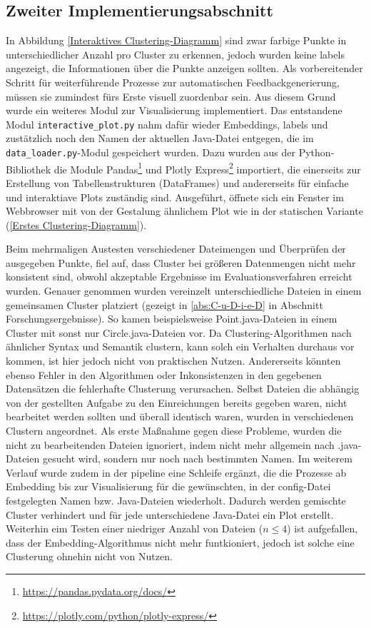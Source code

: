 \subsection{Zweiter Implementierungsabschnitt}
In Abbildung \ref{Interaktives Clustering-Diagramm} sind zwar farbige Punkte in unterschiedlicher Anzahl pro Cluster zu erkennen, jedoch wurden keine labels angezeigt, die Informationen über die Punkte anzeigen sollten. Als vorbereitender Schritt für weiterführende Prozesse zur automatischen Feedbackgenerierung, müssen sie zumindest fürs Erste visuell zuordenbar sein. Aus diesem Grund wurde ein weiteres Modul zur Visualisierung implementiert. Das entstandene Modul \texttt{interactive\_plot.py} nahm dafür wieder Embeddings, labels und zustätzlich noch den Namen der aktuellen Java-Datei entgegen, die im \texttt{data\_loader.py}-Modul gespeichert wurden. Dazu wurden aus der Python-Bibliothek die Module Pandas\footnote{\url{https://pandas.pydata.org/docs/}} und Plotly Express\footnote{\url{https://plotly.com/python/plotly-express/}} importiert, die einerseits zur Erstellung von Tabellenstrukturen (DataFrames) und andererseits für einfache und interaktiave Plots zuständig sind. Ausgeführt, öffnete sich ein Fenster im Webbrowser mit von der Gestalung ähnlichem Plot wie in der statischen Variante (\ref{Erstes Clustering-Diagramm}).

Beim mehrmaligen Austesten verschiedener Dateimengen und Überprüfen der ausgegeben Punkte, fiel auf, dass Cluster bei größeren Datenmengen nicht mehr konsistent sind, obwohl akzeptable Ergebnisse im Evaluationsverfahren erreicht wurden. Genauer genommen wurden vereinzelt unterschiedliche Dateien in einem gemeinsamen Cluster platziert (gezeigt in \ref{abs:C-u-D-i-e-D} in Abschnitt Forschungsergebnisse). So kamen beispielsweise Point.java-Dateien in einem Cluster mit sonst nur Circle.java-Dateien vor. Da Clustering-Algorithmen nach ähnlicher Syntax und Semantik clustern, kann solch ein Verhalten durchaus vor kommen, ist hier jedoch nicht von praktischen Nutzen. Andererseits könnten ebenso Fehler in den Algorithmen oder Inkonsistenzen in den gegebenen Datensätzen die fehlerhafte Clusterung verursachen. Selbst Dateien die abhängig von der gestellten Aufgabe zu den Einreichungen bereits gegeben waren, nicht bearbeitet werden sollten und überall identisch waren, wurden in verschiedenen Clustern angeordnet. Als erste Maßnahme gegen diese Probleme, wurden die nicht zu bearbeitenden Dateien ignoriert, indem nicht mehr allgemein nach \glqq.java\grqq-Dateien gesucht wird, sondern nur noch nach bestimmten Namen. Im weiterem Verlauf wurde zudem in der pipeline eine Schleife ergänzt, die die Prozesse ab Embedding bis zur Visualisierung für die gewünschten, in der config-Datei festgelegten Namen bzw. Java-Dateien wiederholt. Dadurch werden gemischte Cluster verhindert und für jede unterschiedene Java-Datei ein Plot erstellt.
Weiterhin eim Testen einer niedriger Anzahl von Dateien (\(n \leq 4\)) ist aufgefallen, dass der Embedding-Algorithmus nicht mehr funtkioniert, jedoch ist solche eine Clusterung ohnehin nicht von Nutzen.

